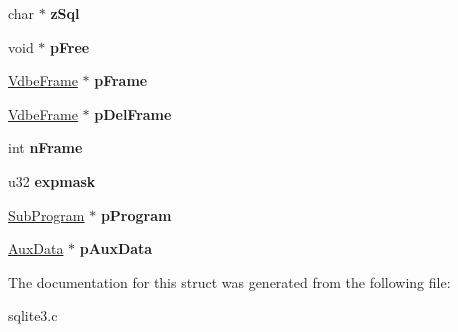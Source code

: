 \begin{DoxyCompactItemize}
\item 
char $\ast$ {\bfseries z\+Sql}\hypertarget{structVdbe_a5a61fd8f84ae0399ef73327e48048ae9}{}\label{structVdbe_a5a61fd8f84ae0399ef73327e48048ae9}

\item 
void $\ast$ {\bfseries p\+Free}\hypertarget{structVdbe_a68dcaae5d4f061da3d7bb96c120fe9a4}{}\label{structVdbe_a68dcaae5d4f061da3d7bb96c120fe9a4}

\item 
\hyperlink{structVdbeFrame}{Vdbe\+Frame} $\ast$ {\bfseries p\+Frame}\hypertarget{structVdbe_afd754aaedd6cd5b229fbeff33177fe04}{}\label{structVdbe_afd754aaedd6cd5b229fbeff33177fe04}

\item 
\hyperlink{structVdbeFrame}{Vdbe\+Frame} $\ast$ {\bfseries p\+Del\+Frame}\hypertarget{structVdbe_ab8f22136c8bdb4c02962a1ae081e9116}{}\label{structVdbe_ab8f22136c8bdb4c02962a1ae081e9116}

\item 
int {\bfseries n\+Frame}\hypertarget{structVdbe_a27fbd083a0335ac2b332d37ea2b90bdc}{}\label{structVdbe_a27fbd083a0335ac2b332d37ea2b90bdc}

\item 
u32 {\bfseries expmask}\hypertarget{structVdbe_a5e22eedb6ee963a0bcf27fc9fd8b8e43}{}\label{structVdbe_a5e22eedb6ee963a0bcf27fc9fd8b8e43}

\item 
\hyperlink{structSubProgram}{Sub\+Program} $\ast$ {\bfseries p\+Program}\hypertarget{structVdbe_a9239ea72573142101328be15c90de62b}{}\label{structVdbe_a9239ea72573142101328be15c90de62b}

\item 
\hyperlink{structAuxData}{Aux\+Data} $\ast$ {\bfseries p\+Aux\+Data}\hypertarget{structVdbe_a43c515d3521658be7f7e33e4eb2aa136}{}\label{structVdbe_a43c515d3521658be7f7e33e4eb2aa136}

\end{DoxyCompactItemize}


The documentation for this struct was generated from the following file\+:\begin{DoxyCompactItemize}
\item 
sqlite3.\+c\end{DoxyCompactItemize}
